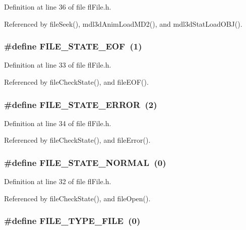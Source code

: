Definition at line 36 of file fl\-File.h.

Referenced by file\-Seek(), mdl3d\-Anim\-Load\-MD2(), and mdl3d\-Stat\-Load\-OBJ().
\subsubsection{\setlength{\rightskip}{0pt plus 5cm}\#define FILE\_\-STATE\_\-EOF~(1)}\label{flFile_8h_53e0b120f12e61c9c077dc96cca3b83c}




Definition at line 33 of file fl\-File.h.

Referenced by file\-Check\-State(), and file\-EOF().
\subsubsection{\setlength{\rightskip}{0pt plus 5cm}\#define FILE\_\-STATE\_\-ERROR~(2)}\label{flFile_8h_83cb987e3f1d0a7b39baab96633d7a71}




Definition at line 34 of file fl\-File.h.

Referenced by file\-Check\-State(), and file\-Error().
\subsubsection{\setlength{\rightskip}{0pt plus 5cm}\#define FILE\_\-STATE\_\-NORMAL~(0)}\label{flFile_8h_d713096415e978fd601e76c07d844f46}




Definition at line 32 of file fl\-File.h.

Referenced by file\-Check\-State(), and file\-Open().
\subsubsection{\setlength{\rightskip}{0pt plus 5cm}\#define FILE\_\-TYPE\_\-FILE~(0)}\label{flFile_8h_bace2d6eb53e065d5a32ab4c4758813b}




